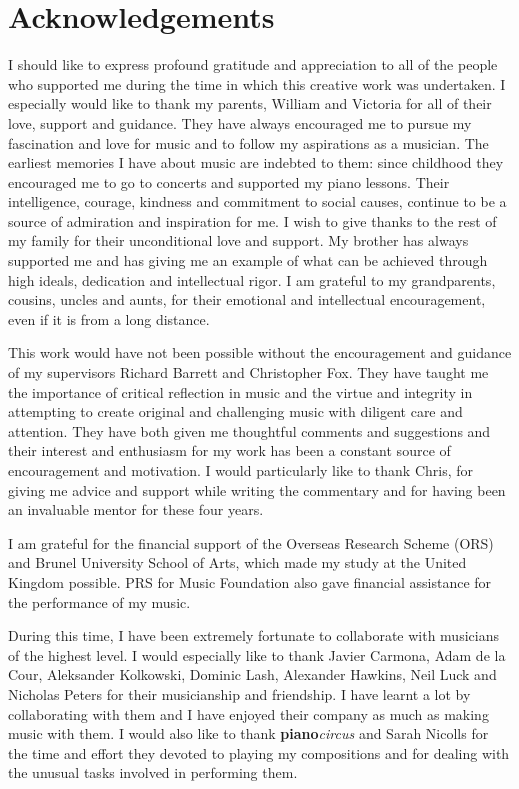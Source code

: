 \chapter*{Acknowledgements}

I should like to express profound gratitude and appreciation to all of the people who supported me during the time in which this creative work was undertaken. I especially would like to thank my parents, William and Victoria for all of their love, support and guidance. They have always encouraged me to pursue my fascination and love for music and to follow my aspirations as a musician. The earliest memories I have about music are indebted to them: since childhood they encouraged me to go to concerts and supported my piano lessons. Their intelligence, courage, kindness and commitment to social causes, continue to be a source of admiration and inspiration for me. I wish to give thanks to the rest of my family for their unconditional love and support. My brother has always supported me and has giving me an example of what can be achieved through high ideals, dedication and intellectual rigor. I am grateful to my grandparents, cousins, uncles and aunts, for their emotional and intellectual encouragement, even if it is from a long distance.

This work would have not been possible without the encouragement and guidance of my supervisors Richard Barrett and Christopher Fox. They have taught me the importance of  critical reflection in music and the virtue and integrity in attempting to create original and challenging music with diligent care and attention. They have both given me thoughtful comments and suggestions and their interest and enthusiasm for my work has been a constant source of encouragement and motivation. I would particularly like to thank Chris, for giving me advice and support while writing the commentary and for having been an invaluable mentor for these four years.

I am grateful for the financial support of the Overseas Research Scheme (ORS) and Brunel University School of Arts, which made my study at the United Kingdom possible. PRS for Music Foundation also gave financial assistance for the performance of my music.

During this time, I have been extremely fortunate to collaborate with musicians of the highest level. I would especially like to thank Javier Carmona, Adam de la Cour, Aleksander Kolkowski, Dominic Lash, Alexander Hawkins, Neil Luck and Nicholas Peters for their musicianship and friendship. I have learnt a lot by collaborating with them and I have enjoyed their company as much as making music with them. I would also like to thank \textbf{piano}\emph{circus} and Sarah Nicolls for the time and effort they devoted to playing my compositions and for dealing with the unusual tasks involved in performing them.
 
